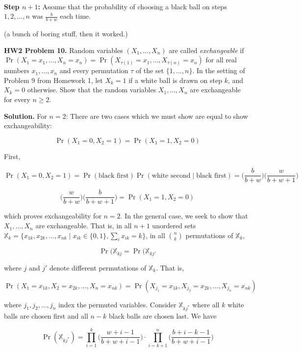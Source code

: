 \

\textbf{Step \(n + 1\):} Assume that the probability of choosing a black ball on steps \(1, 2, \dots, n\) was \( \frac{b}{b+w}\) each time.

(a bunch of boring stuff, then it worked.)

\textbf{HW2 Problem 10.} Random variables \((X_1, \ldots, X_n)\) are called \textit{exchangeable} if \(\Pr(X_1 = x_1, \ldots, X_n = x_n) = \Pr(X_{\tau(1)} = x_1, \ldots, X_{\tau(n)} = x_n) \) for all real numbers \(x_1, \ldots, x_n\) and every permutation \(\tau\) of the set \(\{1, \ldots, n\}\). In the setting of Problem 9 from Homework 1, let \(X_k = 1\) if a white ball is drawn on step \(k\), and \(X_k =0\) otherwise. Show that the random variables \(X_1, \ldots, X_n\) are exchangeable for every \(n \geq 2\).

\textbf{Solution.} For \(n =2\): There are two cases which we must show are equal to show exchangeability:

\[
\Pr(X_1 = 0, X_2 = 1) = \Pr(X_1 = 1, X_2 = 0)
\]

First,

\[
\Pr(X_1 = 0, X_2 = 1) = \Pr(\text{black first}) \Pr(\text{white second} \mid \text{black first}) = \bigg( \frac{b}{b+w}\bigg) \bigg( \frac{w}{b+w+1}\bigg)
\]

\[
\bigg( \frac{w}{b+w}\bigg) \bigg( \frac{b}{b+w+1}\bigg)= \Pr(X_1 = 1, X_2 = 0)
\]

which proves exchangeability for \(n=2\). In the general case, we seek to show that \(X_1, \ldots, X_n\) are exchangeable. That is, in all \(n +1\) unordered sets \(\mathbb{X}_k = \{x_{1k}, x_{2k}, \ldots, x_{nk} \mid x_{ik} \in \{0, 1\}, \sum_i x_{ik} = k\}\), in all \(\binom{n}{k}\) permutations of \(\mathbb{X}_k\), 

\[
\Pr(\mathbb{X}_{kj} = \Pr(\mathbb{X}_{kj'}
\]

where \(j\) and \(j'\) denote different permutations of \(\mathbb{X}_k\). That is,

\[
\Pr(X_1 = x_{1k}, X_2 = x_{2k}, \ldots, X_n = x_{nk}) = \Pr(X_{j_1} = x_{1k}, X_{j_2} = x_{2k}, \ldots, X_{j_n} = x_{nk})
\]

where \(j_1, j_2, \ldots, j_n\) index the permuted variables. Consider \(\mathbb{X}_{kj^*}\) where all \(k\) white balls are chosen first and all \(n -k\) black balls are chosen last. We have

\[
\Pr(\mathbb{X}_{kj^*}) = \prod_{i=1}^k \bigg( \frac{w+i-1}{b+w+i-1}\bigg) \cdot \prod_{i=k+1}^n \bigg( \frac{b+i-k-1}{b+w+i-1} \bigg) 
\]

